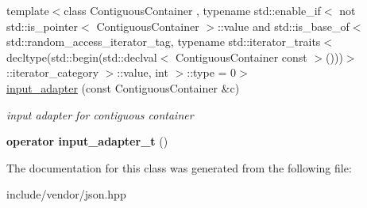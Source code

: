 \begin{DoxyCompactItemize}
\mbox{\label{classnlohmann_1_1detail_1_1input__adapter_a6f92fe82cb49a508dbfb297c5630cc7f}} 
{\footnotesize template$<$class Contiguous\+Container , typename std\+::enable\+\_\+if$<$ not std\+::is\+\_\+pointer$<$ Contiguous\+Container $>$\+::value and std\+::is\+\_\+base\+\_\+of$<$ std\+::random\+\_\+access\+\_\+iterator\+\_\+tag, typename std\+::iterator\+\_\+traits$<$ decltype(std\+::begin(std\+::declval$<$ Contiguous\+Container const $>$()))$>$\+::iterator\+\_\+category $>$\+::value, int $>$\+::type  = 0$>$ }\\\mbox{\hyperlink{classnlohmann_1_1detail_1_1input__adapter_a6f92fe82cb49a508dbfb297c5630cc7f}{input\+\_\+adapter}} (const Contiguous\+Container \&c)
\begin{DoxyCompactList}\small\item\em input adapter for contiguous container \end{DoxyCompactList}\item 
\mbox{\label{classnlohmann_1_1detail_1_1input__adapter_a4ef04b9490247fc38f3d1c2a9e18789b}} 
{\bfseries operator input\+\_\+adapter\+\_\+t} ()
\end{DoxyCompactItemize}


The documentation for this class was generated from the following file\+:\begin{DoxyCompactItemize}
\item 
include/vendor/json.\+hpp\end{DoxyCompactItemize}
